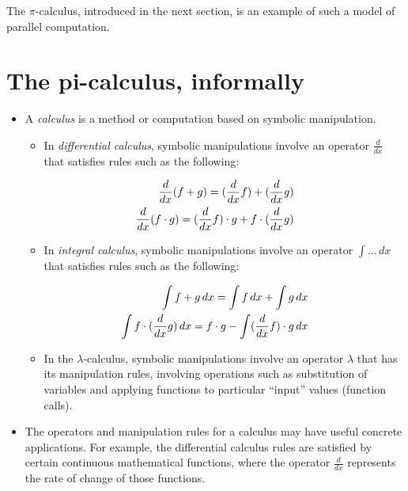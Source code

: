 \documentclass[letterpaper,10pt,openany,oneside]{sphinxmanual}
\begin{document}
The $\pi$-calculus, introduced in the next section, is an example of such a model of parallel computation.


\chapter{The pi-calculus, informally}
\label{ThePiCalculus/ThePiCalculus:the-pi-calculus-informally}\label{ThePiCalculus/ThePiCalculus::doc}\begin{itemize}
\item {} 
A \emph{calculus} is a method or computation based on symbolic manipulation.
\begin{itemize}
\item {} 
In \emph{differential calculus}, symbolic manipulations involve an operator $\frac{d}{dx}$ that satisfies rules such as the following:

\end{itemize}
\begin{gather}
\begin{split}{d\over dx}(f+g) = ({d\over dx}f) + ({d\over dx}g)\\
{d\over dx}(f\cdot g) = ({d\over dx}f) \cdot g + f \cdot ({d\over dx} g)\end{split}\notag
\end{gather}\begin{itemize}
\item {} 
In \emph{integral calculus}, symbolic manipulations involve an operator $\int ...\,dx$ that satisfies rules such as the following:

\end{itemize}
\begin{gather}
\begin{split}\int f+g\,dx = \int f\,dx + \int g\,dx \\
\int f\cdot ({d\over dx}g)\,dx = f\cdot g - \int ({d\over dx}f)\cdot g\,dx\end{split}\notag
\end{gather}\begin{itemize}
\item {} 
In the $\lambda$-calculus, symbolic manipulations involve an operator $\lambda$ that has its manipulation rules, involving operations such as substitution of variables and applying functions to particular ``input'' values (function calls).

\end{itemize}

\item {} 
The operators and manipulation rules for a calculus may have useful concrete applications. For example, the differential calculus rules are satisfied by certain continuous mathematical functions, where the operator $\frac{d}{dx}$ represents the rate of change of those functions.


\end{itemize}
\end{document}
